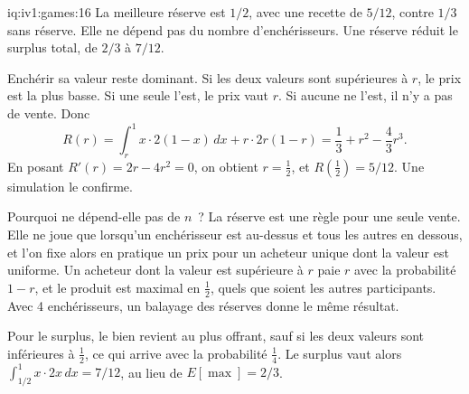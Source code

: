 \begin{solution}{iq:iv1:games:16}
La meilleure réserve est $1/2$, avec une recette de $5/12$, contre $1/3$ sans réserve. Elle ne dépend pas du nombre d'enchérisseurs. Une réserve réduit le surplus total, de $2/3$ à $7/12$.

Enchérir sa valeur reste dominant. Si les deux valeurs sont supérieures à $r$, le prix est la plus basse. Si une seule l'est, le prix vaut $r$. Si aucune ne l'est, il n'y a pas de vente. Donc
\[
R(r) = \int_r^1 x \cdot 2(1 - x)\,dx + r \cdot 2r(1 - r) = \frac13 + r^2 - \frac43 r^3.
\]
En posant $R'(r) = 2r - 4r^2 = 0$, on obtient $r = \tfrac12$, et $R(\tfrac12) = 5/12$. Une simulation le confirme.

Pourquoi ne dépend-elle pas de $n$~? La réserve est une règle pour une seule vente. Elle ne joue que lorsqu'un enchérisseur est au-dessus et tous les autres en dessous, et l'on fixe alors en pratique un prix pour un acheteur unique dont la valeur est uniforme. Un acheteur dont la valeur est supérieure à $r$ paie $r$ avec la probabilité $1 - r$, et le produit est maximal en $\tfrac12$, quels que soient les autres participants. Avec 4 enchérisseurs, un balayage des réserves donne le même résultat.

Pour le surplus, le bien revient au plus offrant, sauf si les deux valeurs sont inférieures à $\tfrac12$, ce qui arrive avec la probabilité $\tfrac14$. Le surplus vaut alors $\int_{1/2}^1 x \cdot 2x\,dx = 7/12$, au lieu de $E[\max] = 2/3$.

\end{solution}

